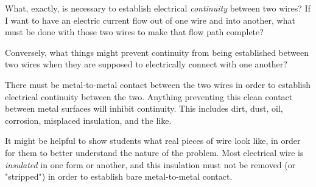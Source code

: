 

What, exactly, is necessary to establish electrical {\it continuity} between two wires?  If I want to have an electric current flow out of one wire and into another, what must be done with those two wires to make that flow path complete?

Conversely, what things might prevent continuity from being established between two wires when they are supposed to electrically connect with one another?







There must be metal-to-metal contact between the two wires in order to establish electrical continuity between the two.  Anything preventing this clean contact between metal surfaces will inhibit continuity.  This includes dirt, dust, oil, corrosion, misplaced insulation, and the like.







It might be helpful to show students what real pieces of wire look like, in order for them to better understand the nature of the problem.  Most electrical wire is {\it insulated} in one form or another, and this insulation must not be removed (or "stripped") in order to establish bare metal-to-metal contact.





